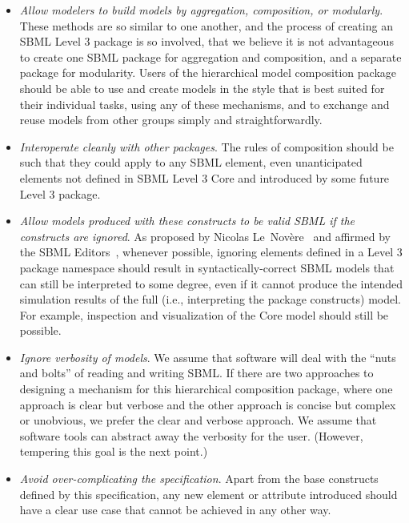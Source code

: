 \begin{itemize}

\item \emph{Allow modelers to build models by aggregation, composition,
    or modularly}.  These methods are so similar to one another, and the
  process of creating an SBML Level 3 package is so involved, that we
  believe it is not advantageous to create one SBML package for
  aggregation and composition, and a separate package for modularity.
  Users of the hierarchical model composition package should be able to
  use and create models in the style that is best suited for their
  individual tasks, using any of these mechanisms, and to exchange and
  reuse models from other groups simply and straightforwardly.

\item \emph{Interoperate cleanly with other packages}. The rules of
  composition should be such that they could apply to any SBML element,
  even unanticipated elements not defined in SBML Level 3 Core and
  introduced by some future Level 3 package.

\item \emph{Allow models produced with these constructs to be valid SBML
    if the constructs are ignored}.  As proposed by Nicolas
  Le~Nov\`{e}re~\citep{lenov:2003} and affirmed by the SBML
  Editors~\citep{editors:2010}, whenever possible, ignoring elements
  defined in a Level 3 package namespace should result in
  syntactically-correct SBML models that can still be interpreted to
  some degree, even if it cannot produce the intended simulation results
  of the full (i.e., interpreting the package constructs) model.  For
  example, inspection and visualization of the Core model should still
  be possible.

\item \emph{Ignore verbosity of models}. We assume that software will
  deal with the ``nuts and bolts'' of reading and writing SBML.  If
  there are two approaches to designing a mechanism for this
  hierarchical composition package, where one approach is clear but
  verbose and the other approach is concise but complex or unobvious, we
  prefer the clear and verbose approach.  We assume that software tools
  can abstract away the verbosity for the user.  (However, tempering
  this goal is the next point.)

\item \emph{Avoid over-complicating the specification}. Apart from the
  base constructs defined by this specification, any new element or
  attribute introduced should have a clear use case that cannot be
  achieved in any other way.


\end{itemize}

